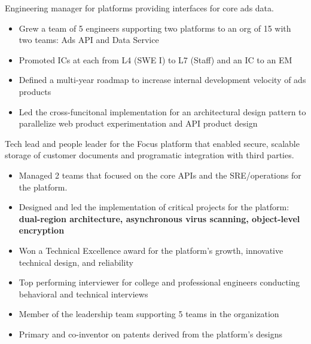 \documentclass[10pt,a4paper,ragged2e,withhyper]{altacv}
\begin{document}

\makecvheader{}



\begin{paracol}{2}



Engineering manager for platforms providing interfaces for core ads data.

\begin{itemize}
\item Grew a team of 5 engineers supporting two platforms to an org of 15 with two teams: Ads API and Data Service
\item Promoted ICs at each from L4 (SWE I) to L7 (Staff) and an IC to an EM
\item Defined a multi-year roadmap to increase internal development velocity of ads products
\item Led the cross-funcitonal implementation for an architectural design pattern to parallelize web product experimentation and API product design
\end{itemize}


\divider{}

Tech lead and people leader for the Focus platform that enabled secure, scalable storage of customer documents and programatic integration with third parties.
\begin{itemize}
\item Managed 2 teams that focused on the core APIs and the SRE/operations for the platform.
\item Designed and led the implementation of critical projects for the platform: \textbf{dual-region architecture, asynchronous virus scanning, object-level encryption}
\item Won a Technical Excellence award for the platform's growth, innovative technical design, and reliability
\item Top performing interviewer for college and professional engineers conducting behavioral and technical interviews
\item Member of the leadership team supporting 5 teams in the organization
\item Primary and co-inventor on patents derived from the platform's designs
\end{itemize}


\end{paracol}
\end{document}
